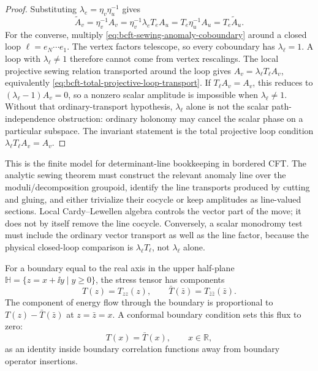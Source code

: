 \begin{proof}
Substituting \(\lambda_e=\eta_v\eta_u^{-1}\) gives
\[
  \widetilde A_v
  =
  \eta_v^{-1}A_v
  =
  \eta_v^{-1}\lambda_eT_eA_u
  =
  T_e\eta_u^{-1}A_u
  =
  T_e\widetilde A_u .
\]
For the converse, multiply
\eqref{eq:bcft-sewing-anomaly-coboundary} around a closed loop
\(\ell=e_N\cdots e_1\).  The vertex factors telescope, so every coboundary
has \(\lambda_\ell=1\).  A loop with \(\lambda_\ell\ne1\) therefore cannot
come from vertex rescalings.  The local projective sewing relation transported
around the loop gives \(A_v=\lambda_\ell T_\ell A_v\), equivalently
\eqref{eq:bcft-total-projective-loop-transport}.  If \(T_\ell A_v=A_v\), this
reduces to \((\lambda_\ell-1)A_v=0\), so a nonzero scalar amplitude is
impossible when \(\lambda_\ell\ne1\).  Without that ordinary-transport
hypothesis, \(\lambda_\ell\) alone is not the scalar path-independence
obstruction: ordinary holonomy may cancel the scalar phase on a particular
subspace.  The invariant statement is the total projective loop condition
\(\lambda_\ell T_\ell A_v=A_v\).
\end{proof}

This is the finite model for determinant-line bookkeeping in bordered CFT.
The analytic sewing theorem must construct the relevant anomaly line over
the moduli/decomposition groupoid, identify the line transports produced by
cutting and gluing, and either trivialize their cocycle or keep amplitudes as
line-valued sections.  Local Cardy--Lewellen algebra controls the vector part
of the move; it does not by itself remove the line cocycle.  Conversely, a
scalar monodromy test must include the ordinary vector transport as well as the
line factor, because the physical closed-loop comparison is
\(\lambda_\ell T_\ell\), not \(\lambda_\ell\) alone.

For a boundary equal to the real axis in the upper half-plane
\(\mathbb H=\{z=x+\ii y\mid y\ge0\}\), the stress tensor has components
\[
  T(z)=T_{zz}(z),\qquad \bar T(\bar z)=T_{\bar z\bar z}(\bar z).
\]
The component of energy flow through the boundary is proportional to
\(T(z)-\bar T(\bar z)\) at \(z=\bar z=x\).  A conformal boundary condition
sets this flux to zero:
\begin{equation}
  T(x)=\bar T(x),
  \qquad x\in\mathbb R,
  \label{eq:bcft-stress-tensor-gluing}
\end{equation}
as an identity inside boundary correlation functions away from boundary
operator insertions.

